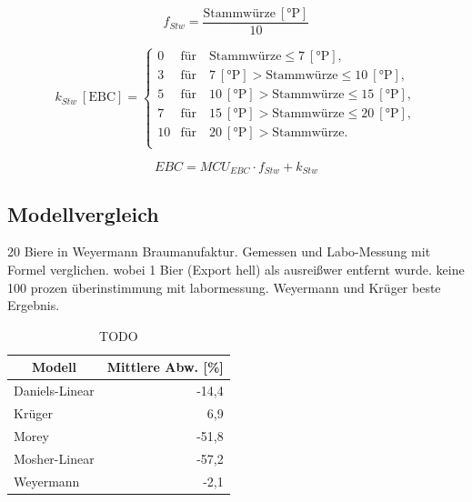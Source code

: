 \documentclass[a4paper,parskip=half]{scrartcl}
\newcommand{\MCUEBC}{\mathit{MCU}_{EBC}}
\newcommand{\EBC}{\mathit{EBC}}
\newcommand{\uebc}{\:[\textrm{EBC}]}
\newcommand{\uplato}{\:[\textrm{°P}]}
\newcommand{\fstw}{f_{Stw}}
\newcommand{\kstw}{k_{Stw}}
\begin{document}
\begin{equation}
\fstw = \frac{\text{Stammwürze} \uplato}{10}
\label{eq:weyermannstw}
\end{equation}

\begin{equation}
\kstw \uebc = \begin{cases}
0  & \text{für} \quad \text{Stammwürze} \le 7 \uplato, \\
3  & \text{für} \quad 7 \uplato > \text{Stammwürze} \le 10 \uplato, \\
5  & \text{für} \quad 10 \uplato > \text{Stammwürze} \le 15 \uplato, \\
7  & \text{für} \quad 15 \uplato > \text{Stammwürze} \le 20 \uplato, \\
10 & \text{für} \quad 20 \uplato > \text{Stammwürze}. \\
\end{cases}
\label{eq:weyermannkstw}
\end{equation}

\begin{equation}
\EBC = \MCUEBC \cdot \fstw + \kstw
\label{eq:ebcweyermann}
\end{equation}

\subsection*{Modellvergleich}


\parencite{KrausWeyermann2021b}
20 Biere in Weyermann Braumanufaktur. Gemessen und Labo-Messung mit Formel verglichen.
wobei 1 Bier (Export hell) als ausreißwer entfernt wurde.
keine 100 prozen überinstimmung mit labormessung.
Weyermann und Krüger beste Ergebnis.

\begin{table}[H]
\centering
\begin{tabular}{lr}
\toprule
\multicolumn{1}{c}{\textbf{Modell}} & \multicolumn{1}{c}{\textbf{Mittlere Abw. [\%]}} \\
\midrule
Daniels-Linear & -14,4 \\
Krüger & 6,9 \\
Morey & -51,8 \\
Mosher-Linear & -57,2 \\
Weyermann & -2,1 \\
\bottomrule
\end{tabular}
\caption{TODO \parencite{KrausWeyermann2021b}}
\label{table:modelcompareall}
\end{table}
\end{document}
